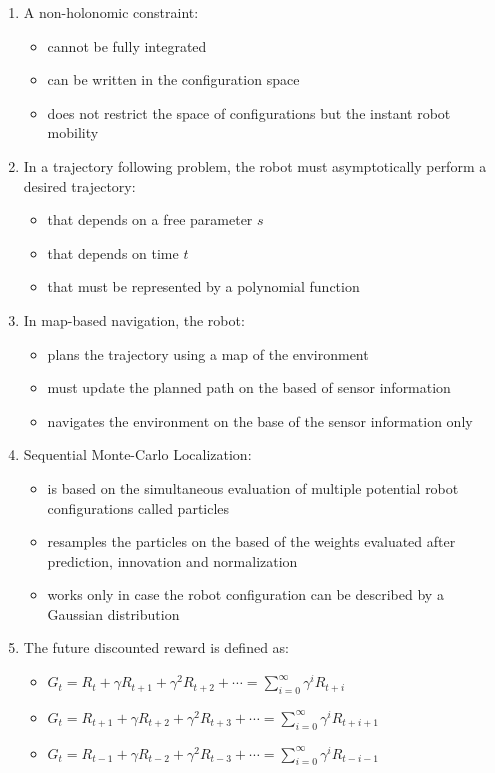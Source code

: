 \documentclass[openany]{book}
\theoremstyle{definition}
\theoremstyle{remark}
\begin{document}
\begin{enumerate}
    \item A non-holonomic constraint:
    \begin{itemize}
        \item[\checkmark] cannot be fully integrated
        \item[] can be written in the configuration space
        \item[\checkmark] does not restrict the space of configurations but the instant robot mobility
    \end{itemize}

    \item In a trajectory following problem, the robot must asymptotically perform a desired trajectory:
    \begin{itemize}
        \item[\checkmark] that depends on a free parameter $s$
        \item[] that depends on time $t$
        \item[] that must be represented by a polynomial function
    \end{itemize}

    \item In map-based navigation, the robot:
    \begin{itemize}
        \item[\checkmark] plans the trajectory using a map of the environment
        \item[] must update the planned path on the based of sensor information
        \item[] navigates the environment on the base of the sensor information only
    \end{itemize}

    \item Sequential Monte-Carlo Localization:
    \begin{itemize}
        \item[\checkmark] is based on the simultaneous evaluation of multiple potential robot configurations called particles
        \item[\checkmark] resamples the particles on the based of the weights evaluated after prediction, innovation and normalization
        \item[] works only in case the robot configuration can be described by a Gaussian distribution
    \end{itemize}

    \item The future discounted reward is defined as:
    \begin{itemize}
        \item[] $G_t = R_t + \gamma R_{t+1} + \gamma^2R_{t+2} + \cdots = \sum_{i=0}^\infty \gamma^i R_{t+i}$
        \item[\checkmark] $G_t = R_{t+1} + \gamma R_{t+2} + \gamma^2R_{t+3} + \cdots = \sum_{i=0}^\infty \gamma^i R_{t+i+1}$
        \item[] $G_t = R_{t-1} + \gamma R_{t-2} + \gamma^2R_{t-3} + \cdots = \sum_{i=0}^\infty \gamma^i R_{t-i-1}$
    \end{itemize}


\end{enumerate}
\end{document}
